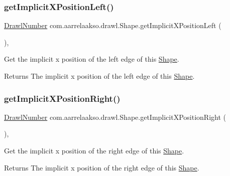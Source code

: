 \subsubsection{\texorpdfstring{get\+Implicit\+X\+Position\+Left()}{getImplicitXPositionLeft()}}
{\footnotesize\ttfamily \hyperlink{classcom_1_1aarrelaakso_1_1drawl_1_1_drawl_number}{Drawl\+Number} com.\+aarrelaakso.\+drawl.\+Shape.\+get\+Implicit\+X\+Position\+Left (\begin{DoxyParamCaption}{ }\end{DoxyParamCaption})\hspace{0.3cm}{\ttfamily [protected]}, {\ttfamily [inherited]}}



Get the implicit x position of the left edge of this \hyperlink{classcom_1_1aarrelaakso_1_1drawl_1_1_shape}{Shape}. 

\begin{DoxyReturn}{Returns}
The implicit x position of the left edge of this \hyperlink{classcom_1_1aarrelaakso_1_1drawl_1_1_shape}{Shape}. 
\end{DoxyReturn}
\mbox{\label{classcom_1_1aarrelaakso_1_1drawl_1_1_shape_aedcaf32e6be1114111e5ee2ddb1214a3}} 
\subsubsection{\texorpdfstring{get\+Implicit\+X\+Position\+Right()}{getImplicitXPositionRight()}}
{\footnotesize\ttfamily \hyperlink{classcom_1_1aarrelaakso_1_1drawl_1_1_drawl_number}{Drawl\+Number} com.\+aarrelaakso.\+drawl.\+Shape.\+get\+Implicit\+X\+Position\+Right (\begin{DoxyParamCaption}{ }\end{DoxyParamCaption})\hspace{0.3cm}{\ttfamily [protected]}, {\ttfamily [inherited]}}



Get the implicit x position of the right edge of this \hyperlink{classcom_1_1aarrelaakso_1_1drawl_1_1_shape}{Shape}. 

\begin{DoxyReturn}{Returns}
The implicit x position of the right edge of this \hyperlink{classcom_1_1aarrelaakso_1_1drawl_1_1_shape}{Shape}. 
\end{DoxyReturn}
\mbox{\label{classcom_1_1aarrelaakso_1_1drawl_1_1_shape_af04961079cb3993d8f73670e6695415b}} 

